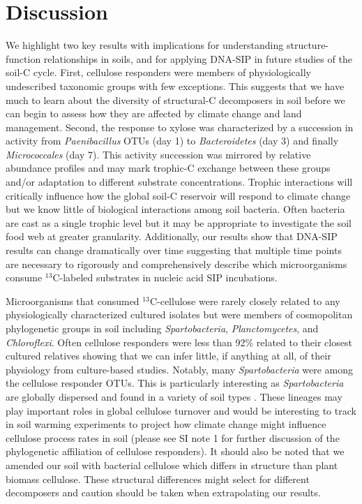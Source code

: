 \section{Discussion} 
We highlight two key results with implications for understanding structure-function
relationships in soils, and for applying DNA-SIP in future studies of the soil-C
cycle. First, cellulose responders were members of physiologically undescribed
taxonomic groups with few exceptions. This suggests that we have much to learn
about the diversity of structural-C decomposers in soil before we can begin to
assess how they are affected by climate change and land management. Second, the
response to xylose was characterized by a succession in activity from
\textit{Paenibacillus} OTUs (day 1) to \textit{Bacteroidetes} (day 3) and finally
\textit{Micrococcales} (day 7). This activity succession was mirrored by relative
abundance profiles and may mark trophic-C exchange between these groups and/or
adaptation to different substrate concentrations. Trophic interactions will
critically influence how the global soil-C reservoir will respond to climate
change \citep{Crowther2015} but we know little of biological interactions among
soil bacteria. Often bacteria are cast as a single trophic level
\citep{Moore1988} but it may be appropriate to investigate the soil food web at
greater granularity. Additionally, our results show that DNA-SIP results can
change dramatically over time suggesting that multiple time points are
necessary to rigorously and comprehensively describe which microorganisms
consume $^{13}$C-labeled substrates in nucleic acid SIP incubations.

Microorganisms that consumed $^{13}$C-cellulose were rarely closely related to any
physiologically characterized cultured isolates but were members of
cosmopolitan phylogenetic groups in soil including \textit{Spartobacteria},
\textit{Planctomycetes}, and \textit{Chloroflexi}. Often cellulose responders
were less than 92\% related to their closest cultured relatives showing that we
can infer little, if anything at all, of their physiology from culture-based
studies. Notably, many \textit{Spartobacteria} were among the cellulose responder OTUs.
This is particularly interesting as \textit{Spartobacteria} are globally
dispersed and found in a variety of soil types \citep{Bergmann_2011}. These lineages may play
important roles in global cellulose turnover and would be interesting to track
in soil warming experiments to project how climate change might influence
cellulose process rates in soil (please see SI note 1 for further discussion of the
phylogenetic affiliation of cellulose responders). It should also be noted that
we amended our soil with bacterial cellulose which differs in structure than
plant biomass cellulose. These structural differences might select for different 
decomposers and caution should be taken when extrapolating our results.

